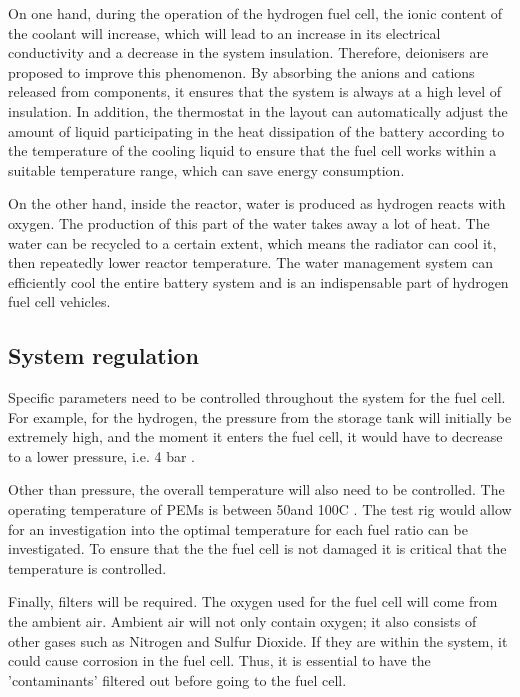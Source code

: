 \documentclass[a4paper,11pt]{article}
\begin{document}
On one hand, during the operation of the hydrogen fuel cell, the ionic content of the coolant will increase, which will lead to an increase in its electrical conductivity and a decrease in the system insulation\cite{BARGAL2020635}. Therefore, deionisers are proposed to improve this phenomenon. By absorbing the anions and cations released from components, it ensures that the system is always at a high level of insulation. In addition, the thermostat in the layout can automatically adjust the amount of liquid participating in the heat dissipation of the battery according to the temperature of the cooling liquid to ensure that the fuel cell works within a suitable temperature range, which can save energy consumption.

On the other hand, inside the reactor, water is produced as hydrogen reacts with oxygen. The production of this part of the water takes away a lot of heat. The water can be recycled to a certain extent, which means the radiator can cool it, then repeatedly lower reactor temperature. The water management system can efficiently cool the entire battery system and is an indispensable part of hydrogen fuel cell vehicles.

\subsection{System regulation}
Specific parameters need to be controlled throughout the system for the fuel cell. For example, for the hydrogen, the pressure from the storage tank will initially be extremely high, and the moment it enters the fuel cell, it would have to decrease to a lower pressure, i.e. 4 bar \cite{hoeflinger2020air}.

Other than pressure, the overall temperature will also need to be controlled. The operating temperature of PEMs is between 50\degree and 100\degree C \cite{deloitte2020FuelCell}. The test rig would allow for an investigation into the optimal temperature for each fuel ratio can be investigated. To ensure that the the fuel cell is not damaged it is critical that the temperature is controlled.

Finally, filters will be required. The oxygen used for the fuel cell will come from the ambient air. Ambient air will not only contain oxygen; it also consists of other gases such as Nitrogen and Sulfur Dioxide\cite{ozyalcin2021investigation}. If they are within the system, it could cause corrosion in the fuel cell. Thus, it is essential to have the 'contaminants' filtered out before going to the fuel cell.
\end{document}
